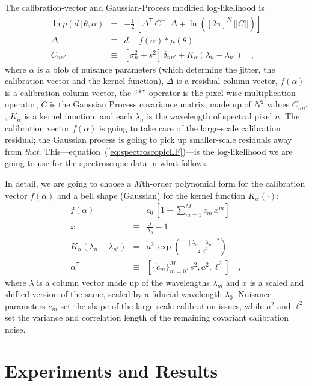 \documentclass[12pt, letterpaper, preprint]{aastex}
\newcommand{\transpose}[1]{{#1}^{\!\mathsf T}}
\newcommand{\given}{\,|\,}
\renewcommand{\det}[1]{||{#1}||}
\begin{document}
The calibration-vector and Gaussian-Process modified log-likelihood is
\begin{eqnarray}\label{eq:spectroscopicLF}
\ln p(d\given\theta,\alpha) &=& -\frac{1}{2}\,\left[\transpose{\Delta}\,C^{-1}\,\Delta + \ln([2\pi]^N\,\det{C}) \right]
\\
\Delta &\equiv& d - f(\alpha)\ast\mu(\theta)
\\
C_{nn'} &\equiv& [\sigma_n^2 + s^2]\,\delta_{nn'} + K_\alpha(\lambda_n - \lambda_{n'})
\quad ,
\end{eqnarray}
where $\alpha$ is a blob of nuisance parameters
(which determine the jitter, the calibration vector and the kernel function),
$\Delta$ is a residual column vector,
$f(\alpha)$ is a calibration column vector,
the ``$\ast$'' operator is the pixel-wise multiplication operator,
$C$ is the Gaussian Process covariance matrix,
made up of $N^2$ values $C_{nn'}$,
$K_\alpha$ is a kernel function,
and each $\lambda_n$ is the wavelength of spectral pixel $n$.
The calibration vector $f(\alpha)$ is going to take care of the
large-scale calibration residual; the Gaussian process is going to
pick up smaller-scale residuals away from \emph{that}.
This---equation~(\ref{eq:spectroscopicLF})---is the log-likelihood we
are going to use for the spectroscopic data in what follows.

In detail, we are going to choose a $M$th-order polynomial form for
the calibration vector $f(\alpha)$ and a bell shape (Gaussian) for the
kernel function $K_\alpha(\cdot)$:
\begin{eqnarray}\displaystyle
f(\alpha) &=& c_0\,[1 + \sum_{m=1}^M c_m\,x^m]
\\
x &\equiv& \frac{\lambda}{\lambda_0} - 1
\\
K_\alpha(\lambda_n - \lambda_{n'}) &=& a^2\,\exp(-\frac{[\lambda_n - \lambda_{n'}]^2}{2\,\ell^2})
\\
\transpose{\alpha} &\equiv& \left[ \{c_m\}_{m=0}^M, s^2, a^2, \ell^2 \right]
\quad ,
\end{eqnarray}
where $\lambda$ is a column vector made up of the wavelengths $\lambda_m$
and $x$ is a scaled and shifted version of the same,
scaled by a fiducial wavelength $\lambda_0$.
Nuisance parameters $c_m$ set the shape of the large-scale calibration
issues, while $a^2$ and $\ell^2$ set the variance and correlation
length of the remaining covariant calibration noise.

\section{Experiments and Results}
\end{document}
